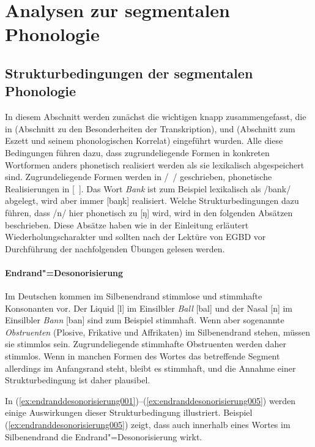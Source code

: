 \section{Analysen zur segmentalen Phonologie}
\label{sec:phonologie:analysenzursegmentalenphonologie}

\subsection{Strukturbedingungen der segmentalen Phonologie}
\label{sec:phonologie:strukturbedingungendersegmentalenphonologie}

In diesem Abschnitt werden zunächst die wichtigen  knapp zusammengefasst, die in  (Abschnitt zu den Besonderheiten der Transkription),  und  (Abschnitt zum Eszett und seinem phonologischen Korrelat) eingeführt wurden.
Alle diese Bedingungen führen dazu, dass zugrundeliegende Formen in konkreten Wortformen anders phonetisch realisiert werden als sie lexikalisch abgespeichert sind.
Zugrundeliegende Formen werden in /~/ geschrieben, phonetische Realisierungen in [~].
Das Wort \textit{Bank} ist zum Beispiel lexikalisch als /bank/ abgelegt, wird aber immer [baŋk] realisiert.
Welche Strukturbedingungen dazu führen, dass /n/ hier phonetisch zu [ŋ] wird, wird in den folgenden Absätzen beschrieben.
Diese Absätze haben wie in der Einleitung erläutert Wiederholungscharakter und sollten nach der Lektüre von EGBD vor Durchführung der nachfolgenden Übungen gelesen werden.

\paragraph*{Endrand"=Desonorisierung}

Im Deutschen kommen im Silbenendrand stimmlose und stimmhafte Konsonanten vor.
Der Liquid [l] im Einsilbler \textit{Ball} [bal] und der Nasal [n] im Einsilbler \textit{Bann} [ban] sind zum Beispiel stimmhaft.
Wenn aber sogenannte \textit{Obstruenten} (Plosive, Frikative und Affrikaten) im Silbenendrand stehen, müssen sie stimmlos sein.
Zugrundeliegende stimmhafte Obstruenten werden daher stimmlos.
Wenn in manchen Formen des Wortes das betreffende Segment allerdings im Anfangsrand steht, bleibt es stimmhaft, und die Annahme einer Strukturbedingung ist daher plausibel.

In (\ref{ex:endranddesonorisierung001})--(\ref{ex:endranddesonorisierung005}) werden einige Auswirkungen dieser Strukturbedingung illustriert.
Beispiel (\ref{ex:endranddesonorisierung005}) zeigt, dass auch innerhalb eines Wortes im Silbenendrand die Endrand"=Desonorisierung wirkt.

